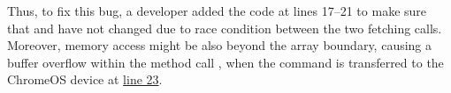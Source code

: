 




Thus, to fix this bug, a developer added the code at lines 17--21 to make sure that  and  have not changed due to race condition between the two fetching calls. Moreover, memory access might be also beyond the array boundary, causing a buffer overflow within the method call , when the command is transferred to the ChromeOS device at \underline{line 23}.

